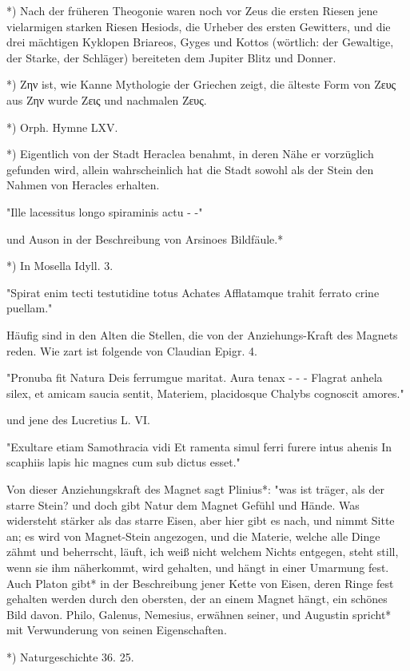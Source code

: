 \documentclass[a4paper, 11pt, oneside, polutonikogreek, german]{article}
\begin{document}
*) Nach der früheren Theogonie waren noch vor Zeus die ersten Riesen jene vielarmigen starken Riesen Hesiods, die Urheber des ersten Gewitters, und die drei mächtigen Kyklopen Briareos, Gyges und Kottos (wörtlich: der Gewaltige, der Starke, der Schläger) bereiteten dem Jupiter Blitz und Donner.

*) Ζην ist, wie Kanne Mythologie der Griechen zeigt, die älteste Form von Ζευς aus Ζην wurde Ζεις und nachmalen Ζευς.

*) Orph. Hymne LXV.

*) Eigentlich von der Stadt Heraclea benahmt, in deren Nähe er vorzüglich gefunden wird, allein wahrscheinlich hat die Stadt sowohl als der Stein den Nahmen von Heracles erhalten.

"Ille lacessitus longo spiraminis actu - -"

und Auson in der Beschreibung von Arsinoes Bildfäule.*

*) In Mosella Idyll. 3.

"Spirat enim tecti testutidine totus Achates
Afflatamque trahit ferrato crine puellam."

Häufig sind in den Alten die Stellen, die von der Anziehungs-Kraft des Magnets reden. Wie zart ist folgende von Claudian Epigr. 4.

"Pronuba fit Natura Deis ferrumgue maritat.
Aura tenax - - -
Flagrat anhela silex, et amicam saucia sentit,
Materiem, placidosque Chalybs cognoscit
amores."

und jene des Lucretius L. VI.

"Exultare etiam Samothracia vidi
Et ramenta simul ferri furere intus ahenis
In scaphiis lapis hic magnes cum sub dictus
esset."

Von dieser Anziehungskraft des Magnet sagt Plinius*: "was ist träger, als der starre Stein? und doch gibt Natur dem Magnet Gefühl und Hände. Was widersteht stärker als das starre Eisen, aber hier gibt es nach, und nimmt Sitte an; es wird von Magnet-Stein angezogen, und die Materie, welche alle Dinge zähmt und beherrscht, läuft, ich weiß nicht welchem Nichts entgegen, steht still, wenn sie ihm näherkommt, wird gehalten, und hängt in einer Umarmung fest. Auch Platon gibt* in der Beschreibung jener Kette von Eisen, deren Ringe fest gehalten werden durch den obersten, der an einem Magnet hängt, ein schönes Bild davon. Philo, Galenus, Nemesius, erwähnen seiner, und Augustin spricht* mit Verwunderung von seinen Eigenschaften.

*) Naturgeschichte 36. 25.
\end{document}
